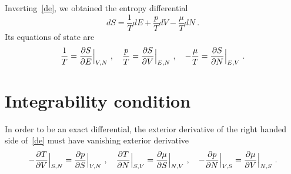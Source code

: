     Inverting~\eqref{de}, we obtained the entropy differential
    \begin{equation}\label{ds}
        dS = \frac{1}{T} dE + \frac{p}{T} dV - \frac{\mu}{T} dN ~.
    \end{equation}
    Its equations of state are 
    \begin{equation}\label{ses}
        \frac{1}{T} = \frac{\partial S}{\partial E} \Big \vert_{V, N} ~, \quad \frac{p}{T} = \frac{\partial S}{\partial V} \Big \vert_{E, N} ~, \quad - \frac{\mu}{T} = \frac{\partial S}{\partial N} \Big \vert_{E, V} ~.
    \end{equation}

\section{Integrability condition} 

    In order to be an exact differential, the exterior derivative of the right handed side of~\eqref{de} must have vanishing exterior derivative
    \begin{equation}\label{intconden}
        - \frac{\partial T}{\partial V} \Big \vert_{S,N} = \frac{\partial p}{\partial S} \Big \vert_{V,N} ~, \quad 
        \frac{\partial T}{\partial N} \Big \vert_{S,V} = \frac{\partial\mu}{\partial S} \Big \vert_{N, V} ~, \quad 
        - \frac{\partial p}{\partial N} \Big \vert_{V,S} = \frac{\partial\mu}{\partial V} \Big \vert_{N, S} ~. 
    \end{equation}

